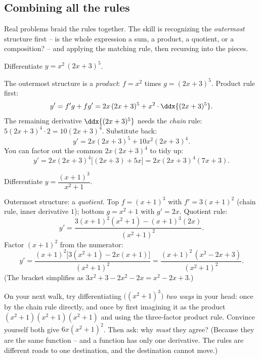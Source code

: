 \subsection{Combining all the rules}

Real problems braid the rules together. The skill is recognizing the \emph{outermost}
structure first -- is the whole expression a sum, a product, a quotient, or a composition?
-- and applying the matching rule, then recursing into the pieces.

\begin{example}\label{ch11:ex-combo1}
Differentiate $y = x^2\,(2x+3)^5$.

The outermost structure is a \emph{product}: $f = x^2$ times $g = (2x+3)^5$. Product rule
first:
\[
  y' = f'g + fg' = 2x\,(2x+3)^5 + x^2\cdot\ddx{(2x+3)^5}.
\]
The remaining derivative $\ddx{(2x+3)^5}$ needs the \emph{chain} rule:
$5(2x+3)^4\cdot 2 = 10(2x+3)^4$. Substitute back:
\[
  y' = 2x(2x+3)^5 + 10x^2(2x+3)^4 .
\]
You can factor out the common $2x(2x+3)^4$ to tidy up:
\[
  y' = 2x(2x+3)^4\big[(2x+3) + 5x\big] = 2x(2x+3)^4(7x+3).
\]
\end{example}

\begin{example}\label{ch11:ex-combo2}
Differentiate $y = \dfrac{(x+1)^3}{x^2+1}$.

Outermost structure: a \emph{quotient}. Top $f = (x+1)^3$ with $f' = 3(x+1)^2$ (chain
rule, inner derivative $1$); bottom $g = x^2+1$ with $g' = 2x$. Quotient rule:
\[
  y' = \frac{3(x+1)^2(x^2+1) - (x+1)^3(2x)}{(x^2+1)^2}.
\]
Factor $(x+1)^2$ from the numerator:
\[
  y' = \frac{(x+1)^2\big[3(x^2+1) - 2x(x+1)\big]}{(x^2+1)^2}
     = \frac{(x+1)^2\,(x^2 - 2x + 3)}{(x^2+1)^2}.
\]
(The bracket simplifies as $3x^2+3-2x^2-2x = x^2-2x+3$.)
\end{example}

\begin{walkbox}
On your next walk, try differentiating $\big((x^2+1)^3\big)$ \emph{two ways} in your head:
once by the chain rule directly, and once by first imagining it as the product
$(x^2+1)(x^2+1)(x^2+1)$ and using the three-factor product rule. Convince yourself both
give $6x(x^2+1)^2$. Then ask: why \emph{must} they agree? (Because they are the same
function -- and a function has only one derivative. The rules are different roads to one
destination, and the destination cannot move.)
\end{walkbox}

